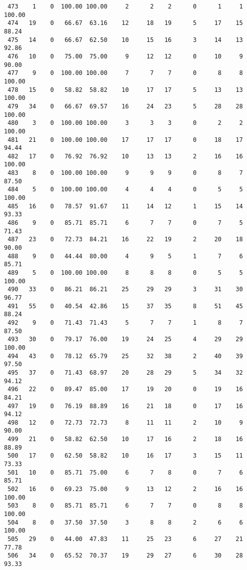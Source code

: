 \begin{verbatim}
 473    1    0  100.00 100.00     2      2    2      0      1     1   100.00
 474   19    0   66.67  63.16    12     18   19      5     17    15    88.24
 475   14    0   66.67  62.50    10     15   16      3     14    13    92.86
 476   10    0   75.00  75.00     9     12   12      0     10     9    90.00
 477    9    0  100.00 100.00     7      7    7      0      8     8   100.00
 478   15    0   58.82  58.82    10     17   17      5     13    13   100.00
 479   34    0   66.67  69.57    16     24   23      5     28    28   100.00
 480    3    0  100.00 100.00     3      3    3      0      2     2   100.00
 481   21    0  100.00 100.00    17     17   17      0     18    17    94.44
 482   17    0   76.92  76.92    10     13   13      2     16    16   100.00
 483    8    0  100.00 100.00     9      9    9      0      8     7    87.50
 484    5    0  100.00 100.00     4      4    4      0      5     5   100.00
 485   16    0   78.57  91.67    11     14   12      1     15    14    93.33
 486    9    0   85.71  85.71     6      7    7      0      7     5    71.43
 487   23    0   72.73  84.21    16     22   19      2     20    18    90.00
 488    9    0   44.44  80.00     4      9    5      1      7     6    85.71
 489    5    0  100.00 100.00     8      8    8      0      5     5   100.00
 490   33    0   86.21  86.21    25     29   29      3     31    30    96.77
 491   55    0   40.54  42.86    15     37   35      8     51    45    88.24
 492    9    0   71.43  71.43     5      7    7      1      8     7    87.50
 493   30    0   79.17  76.00    19     24   25      4     29    29   100.00
 494   43    0   78.12  65.79    25     32   38      2     40    39    97.50
 495   37    0   71.43  68.97    20     28   29      5     34    32    94.12
 496   22    0   89.47  85.00    17     19   20      0     19    16    84.21
 497   19    0   76.19  88.89    16     21   18      0     17    16    94.12
 498   12    0   72.73  72.73     8     11   11      2     10     9    90.00
 499   21    0   58.82  62.50    10     17   16      2     18    16    88.89
 500   17    0   62.50  58.82    10     16   17      3     15    11    73.33
 501   10    0   85.71  75.00     6      7    8      0      7     6    85.71
 502   16    0   69.23  75.00     9     13   12      2     16    16   100.00
 503    8    0   85.71  85.71     6      7    7      0      8     8   100.00
 504    8    0   37.50  37.50     3      8    8      2      6     6   100.00
 505   29    0   44.00  47.83    11     25   23      6     27    21    77.78
 506   34    0   65.52  70.37    19     29   27      6     30    28    93.33

\end{verbatim}
